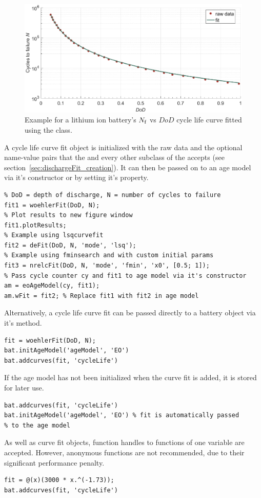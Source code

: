 \begin{figure}[t!]
	\captionsetup{type=figure}
	\centering
	\includegraphics[width=\textwidth]{woehlerFit}
	\caption[Example for a lithium ion battery's $N\subi{f}$ vs $DoD$ cycle life curve fitted using the  class]{Example for a lithium ion battery's $N\subi{f}$ vs $DoD$ cycle life curve fitted using the  class.}
	\label{fig:woehlerFit}
\end{figure}
A cycle life curve fit object is initialized with the raw data and the optional name-value pairs that the  and every other subclass of the  accepts (see section~\ref{sec:dischargeFit_creation}). It can then be passed on to an age model via it's constructor or by setting it's  property.
\begin{lstlisting}
% DoD = depth of discharge, N = number of cycles to failure
fit1 = woehlerFit(DoD, N);
% Plot results to new figure window
fit1.plotResults;
% Example using lsqcurvefit
fit2 = deFit(DoD, N, 'mode', 'lsq');
% Example using fminsearch and with custom initial params
fit3 = nrelcFit(DoD, N, 'mode', 'fmin', 'x0', [0.5; 1]);
% Pass cycle counter cy and fit1 to age model via it's constructor
am = eoAgeModel(cy, fit1);
am.wFit = fit2; % Replace fit1 with fit2 in age model
\end{lstlisting}
\clearpage
Alternatively, a cycle life curve fit can be passed directly to a battery object  via it's  method.
\begin{lstlisting}
fit = woehlerFit(DoD, N);
bat.initAgeModel('ageModel', 'EO')
bat.addcurves(fit, 'cycleLife')
\end{lstlisting}
If the age model has not been initialized when the curve fit is added, it is stored for later use.
\begin{lstlisting}
bat.addcurves(fit, 'cycleLife')
bat.initAgeModel('ageModel', 'EO') % fit is automatically passed
% to the age model
\end{lstlisting}
As well as curve fit objects, function handles to functions of one variable are accepted. However, anonymous functions are not recommended, due to their significant performance penalty.
\begin{lstlisting}
fit = @(x)(3000 * x.^(-1.73));
bat.addcurves(fit, 'cycleLife')
\end{lstlisting}

